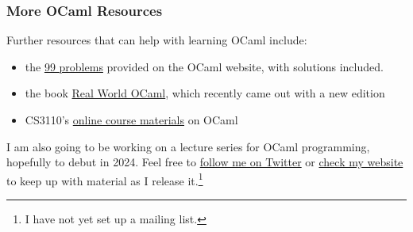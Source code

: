 \documentclass[aspectratio=169, handout]{beamer}
\begin{document}
\begin{frame}[fragile]
  \frametitle{More OCaml Resources}

  Further resources that can help with learning OCaml include:

  \vspace{\fill}

  \begin{itemize}

    \item the {\color{blue}\href{https://v2.ocaml.org/learn/tutorials/99problems.html}{99
    problems}} provided on
    the OCaml website, with solutions included.
    \item the book {\color{blue}\href{https://dev.realworldocaml.org/}{Real World OCaml}}, which
    recently came out with a new edition
    \item CS3110's {\color{blue}\href{https://cs3110.github.io/textbook/cover.html}{online course materials}} on OCaml
  \end{itemize}

  \vspace{\fill}

  I am also going to be working on a lecture series for OCaml programming, hopefully
  to debut in 2024. Feel free to {\color{blue}\href{https://twitter.com/onefiftyman}{follow me on Twitter}}
  or {\color{blue}\href{https://brandonspark.github.io/}{check my website}} to keep up with material as I release it.\footnote{I have not yet set up a mailing list.}

\end{frame}

\thankyou
\end{document}
